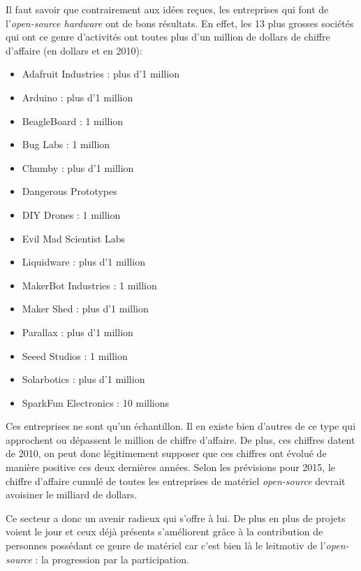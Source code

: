 Il faut savoir que contrairement aux idées reçues, les entreprises qui font de l'\textit{open-source hardware} ont de bons résultats. En effet, les 13 plus grosses sociétés qui ont ce genre d'activités ont toutes plus d'un million de dollars de chiffre d'affaire (en dollars et en 2010)\cite{TORRONE_FRIED}:
 \begin{itemize}
 \item Adafruit Industries : plus d'1 million
 \item Arduino : plus d'1 million
 \item BeagleBoard : 1 million
 \item Bug Labs : 1 million
 \item Chumby : plus d'1 million
 \item Dangerous Prototypes
 \item DIY Drones : 1 million
 \item Evil Mad Scientist  Labs
 \item Liquidware : plus d'1 million
 \item MakerBot Industries : 1 million
 \item Maker Shed : plus d'1 million
 \item Parallax : plus d'1 million
 \item Seeed Studios : 1 million
 \item Solarbotics : plus d'1 million
 \item SparkFun Electronics : 10 millions
 \end{itemize}  
Ces entreprises ne sont qu'un échantillon. Il en existe bien d'autres de ce type qui approchent ou dépassent le million de chiffre d'affaire. De plus, ces chiffres datent de 2010, on peut donc légitimement supposer que ces chiffres ont évolué de manière positive ces deux dernières années. Selon les prévisions pour 2015, le chiffre d'affaire cumulé de toutes les entreprises de matériel \textit{open-source} devrait avoisiner le milliard de dollars.

Ce secteur a donc un avenir radieux qui s'offre à lui. De plus en plus de projets voient le jour et ceux déjà présents s'améliorent grâce à la contribution de personnes possédant ce genre de matériel car c'est bien là le leitmotiv de l'\textit{open-source} : la progression par la participation.
